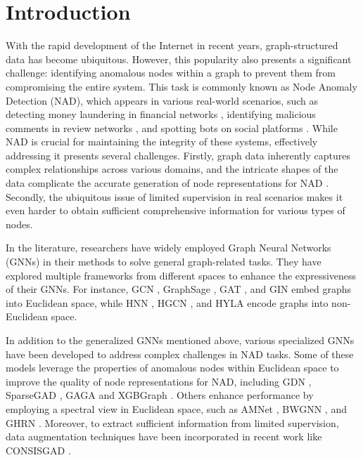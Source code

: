 \section{Introduction}
\label{sec:introduction}


With the rapid development of the Internet in recent years, graph-structured data has become ubiquitous. However, this popularity also presents a significant challenge: identifying anomalous nodes within a graph to prevent them from compromising the entire system. This task is commonly known as Node Anomaly Detection (NAD), which appears in various real-world scenarios, such as detecting money laundering in financial networks \citep{dgraphfin22huang}, identifying malicious comments in review networks \citep{review19li}, and spotting bots on social platforms \citep{bot22guo}. While NAD is crucial for maintaining the integrity of these systems, effectively addressing it presents several challenges. Firstly, graph data inherently captures complex relationships across various domains, and the intricate shapes of the data complicate the accurate generation of node representations for NAD \citep{xiangyu2025smoothgnn}. Secondly, the ubiquitous issue of limited supervision in real scenarios makes it even harder to obtain sufficient comprehensive information for various types of nodes. 

In the literature, researchers have widely employed Graph Neural Networks (GNNs) in their methods to solve general graph-related tasks. They have explored multiple frameworks from different spaces to enhance the expressiveness of their GNNs. For instance, GCN \citep{gcn17kipf}, GraphSage \citep{graphsage17hamilton}, GAT \citep{gat18velickovic}, and GIN \citep{gin19xu} embed graphs into Euclidean space, while HNN \citep{hnn18ganea}, HGCN \citep{hgcn19chami}, and HYLA \citep{hyla23yu} encode graphs into non-Euclidean space.

In addition to the generalized GNNs mentioned above, various specialized GNNs have been developed to address complex challenges in NAD tasks. Some of these models leverage the properties of anomalous nodes within Euclidean space to improve the quality of node representations for NAD, including GDN \citep{gdn23gao}, SparseGAD \citep{sparsegad23gong}, GAGA \citep{gaga23wang} and XGBGraph \citep{gadbench23tang}. Others enhance performance by employing a spectral view in Euclidean space, such as AMNet \citep{amnet22chai}, BWGNN \citep{bwgnn22tang}, and GHRN \citep{ghrn23gao}. Moreover, to extract sufficient information from limited supervision, data augmentation techniques have been incorporated in recent work like CONSISGAD \citep{consisgad24chen}. 

